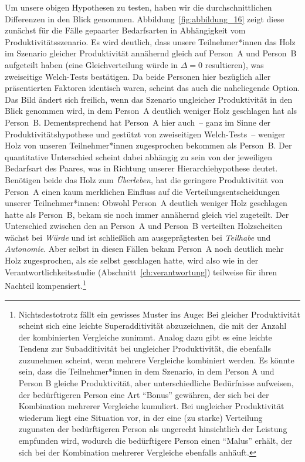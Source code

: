 \documentclass[justified,nobib,nohyper,symmetric,twoside]{tufte-book}
\begin{document}
Um unsere obigen Hypothesen zu testen, haben wir die durchschnittlichen Differenzen in den Blick genommen.
Abbildung~\ref{fig:abbildung_16} zeigt diese zunächst für die Fälle gepaarter Bedarfsarten in Abhängigkeit vom Produktivitätsszenario.
Es wird deutlich, dass unsere Teilnehmer*innen das Holz im Szenario gleicher Produktivität annähernd gleich auf Person~A und Person~B aufgeteilt haben (eine Gleichverteilung würde in $\Delta = \textrm{0}$ resultieren), was zweiseitige Welch-Tests bestätigen.
Da beide Personen hier bezüglich aller präsentierten Faktoren identisch waren, scheint das auch die naheliegende Option.
Das Bild ändert sich freilich, wenn das Szenario ungleicher Produktivität in den Blick genommen wird, in dem Person~A deutlich weniger Holz geschlagen hat als Person~B.
Dementsprechend hat Person~A hier auch~-- ganz im Sinne der Produktivitätshypothese und gestützt von zweiseitigen Welch-Tests~-- weniger Holz von unseren Teilnehmer*innen zugesprochen bekommen als Person~B.
Der quantitative Unterschied scheint dabei abhängig zu sein von der jeweiligen Bedarfsart des Paares, was in Richtung unserer Hierarchiehypothese deutet.
Benötigen beide das Holz zum \textit{Überleben}, hat die geringere Produktivität von Person~A einen kaum merklichen Einfluss auf die Verteilungsentscheidungen unserer Teilnehmer*innen: Obwohl Person~A deutlich weniger Holz geschlagen hatte als Person~B, bekam sie noch immer annähernd gleich viel zugeteilt.
Der Unterschied zwischen den an Person~A und Person~B verteilten Holzscheiten wächst bei \textit{Würde} und ist schließlich am ausgeprägtesten bei \textit{Teilhabe} und \textit{Autonomie}.
Aber selbst in diesen Fällen bekam Person~A noch deutlich mehr Holz zugesprochen, als sie selbst geschlagen hatte, wird also wie in der Verantwortlichkeitsstudie (Abschnitt~\ref{ch:verantwortung}) teilweise für ihren Nachteil kompensiert.\footnote[][-2cm]{Nichtsdestotrotz fällt ein gewisses Muster ins Auge: Bei gleicher Produktivität scheint sich eine leichte Superadditivität abzuzeichnen, die mit der Anzahl der kombinierten Vergleiche zunimmt. Analog dazu gibt es eine leichte Tendenz zur Subadditivität bei ungleicher Produktivität, die ebenfalls zuzunehmen scheint, wenn mehrere Vergleiche kombiniert werden. Es könnte sein, dass die Teilnehmer*innen in dem Szenario, in dem Person A und Person B gleiche Produktivität, aber unterschiedliche Bedürfnisse aufweisen, der bedürftigeren Person eine Art \enquote{Bonus} gewähren, der sich bei der Kombination mehrerer Vergleiche kumuliert. Bei ungleicher Produktivität wiederum liegt eine Situation vor, in der eine (zu starke) Verteilung zugunsten der bedürftigeren Person als ungerecht hinsichtlich der Leistung empfunden wird, wodurch die bedürftigere Person einen \enquote{Malus} erhält, der sich bei der Kombination mehrerer Vergleiche ebenfalls anhäuft.}
\end{document}
